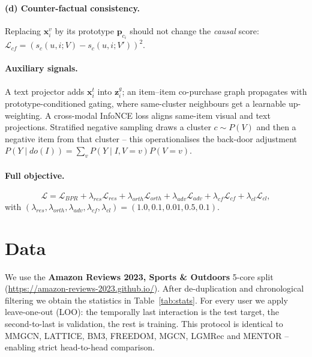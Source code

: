 \documentclass[12pt,a4paper]{article}
\begin{document}
\paragraph{(d) Counter-factual consistency.}
Replacing $\mathbf{x}_i^v$ by its prototype $\mathbf{p}_{c_i}$ should not change the
\emph{causal} score: $\mathcal{L}_{cf}=(s_c(u,i;V)-s_c(u,i;V'))^2$.

\paragraph{Auxiliary signals.} A text projector adds $\mathbf{x}_i^t$ into
$\mathbf{z}_i^g$; an item--item co-purchase graph propagates with prototype-conditioned
gating, where same-cluster neighbours get a learnable up-weighting. A cross-modal
InfoNCE loss aligns same-item visual and text projections. Stratified negative sampling
draws a cluster $c\!\sim\!P(V)$ and then a negative item from that cluster -- this
operationalises the back-door adjustment $P(Y\mid do(I))=\sum_v P(Y\mid I,V{=}v)P(V{=}v)$.

\paragraph{Full objective.}
\begin{equation*}
\mathcal{L}=\mathcal{L}_{BPR}+\lambda_{res}\mathcal{L}_{res}
+\lambda_{orth}\mathcal{L}_{orth}+\lambda_{adv}\mathcal{L}_{adv}
+\lambda_{cf}\mathcal{L}_{cf}+\lambda_{cl}\mathcal{L}_{cl},
\end{equation*}
with $(\lambda_{res},\lambda_{orth},\lambda_{adv},\lambda_{cf},\lambda_{cl})=(1.0,0.1,0.01,0.5,0.1)$.

\section{Data}
We use the \textbf{Amazon Reviews 2023, Sports \& Outdoors} 5-core split
(\url{https://amazon-reviews-2023.github.io/}). After
de-duplication and chronological filtering we obtain the statistics in Table~\ref{tab:stats}.
For every user we apply leave-one-out (LOO): the temporally last interaction is the
test target, the second-to-last is validation, the rest is training. This protocol
is identical to MMGCN, LATTICE, BM3, FREEDOM, MGCN, LGMRec and MENTOR -- enabling
strict head-to-head comparison.
\end{document}
